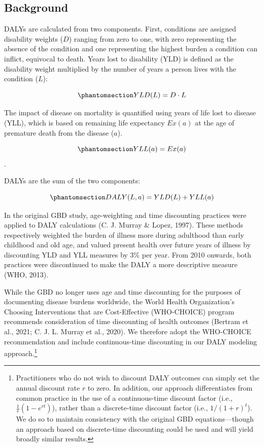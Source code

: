\documentclass[
]{agujournal2019}
\begin{document}
\subsection{Background}\label{sec-background}

DALYs are calculated from two components. First, conditions are assigned
disability weights (\(D\)) ranging from zero to one, with zero
representing the absence of the condition and one representing the
highest burden a condition can inflict, equivocal to death. Years lost
to disability (YLD) is defined as the disability weight multiplied by
the number of years a person lives with the condition (\(L\)):

\begin{equation}\phantomsection\label{eq-yld1}{
YLD(L) = D \cdot L
}\end{equation}

The impact of disease on mortality is quantified using years of life
lost to disease (YLL), which is based on remaining life expectancy
\(Ex(a)\) at the age of premature death from the disease (\(a\)).

\begin{equation}\phantomsection\label{eq-yll1}{
YLL(a)= Ex(a)
}\end{equation} .

DALYs are the sum of the two components:

\begin{equation}\phantomsection\label{eq-daly}{
DALY(L,a) = YLD(L) + YLL(a)
}\end{equation}

In the original GBD study, age-weighting and time discounting practices
were applied to DALY calculations (C. J. Murray \& Lopez, 1997). These
methods respectively weighted the burden of illness more during
adulthood than early childhood and old age, and valued present health
over future years of illness by discounting YLD and YLL measures by 3\%
per year. From 2010 onwards, both practices were discontinued to make
the DALY a more descriptive measure (WHO, 2013).

While the GBD no longer uses age and time discounting for the purposes
of documenting disease burdens worldwide, the World Health
Organization's Choosing Interventions that are Cost-Effective
(WHO-CHOICE) program recommends consideration of time discounting of
health outcomes (Bertram et al., 2021; C. J. L. Murray et al., 2020). We
therefore adopt the WHO-CHOICE recommendation and include
continuous-time discounting in our DALY modeling approach.\footnote{Practitioners
  who do not wish to discount DALY outcomes can simply set the annual
  discount rate \(r\) to zero. In addition, our approach differentiates
  from common practice in the use of a continuous-time discount factor
  (i.e., \(\frac{1}{r}(1-e^{rt})\)), rather than a discrete-time
  discount factor (i.e., \(1/(1+r)^t\)). We do so to maintain
  consistency with the original GBD equations---though an approach based
  on discrete-time discounting could be used and will yield broadly
  similar results.}
\end{document}
